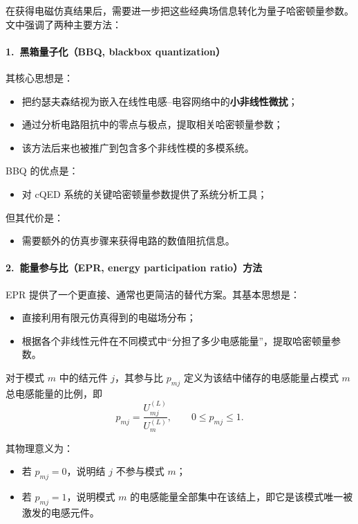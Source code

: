 \documentclass[12pt,a4paper,oneside]{ctexbook}
\begin{document}
在获得电磁仿真结果后，需要进一步把这些经典场信息转化为量子哈密顿量参数。文中强调了两种主要方法：

\paragraph{1.\ 黑箱量子化（BBQ, blackbox quantization）}
其核心思想是：
\begin{itemize}
    \item 把约瑟夫森结视为嵌入在线性电感--电容网络中的\textbf{小非线性微扰}；
    \item 通过分析电路阻抗中的零点与极点，提取相关哈密顿量参数；
    \item 该方法后来也被推广到包含多个非线性模的多模系统。
\end{itemize}

BBQ 的优点是：
\begin{itemize}
    \item 对 cQED 系统的关键哈密顿量参数提供了系统分析工具；
\end{itemize}

但其代价是：
\begin{itemize}
    \item 需要额外的仿真步骤来获得电路的数值阻抗信息。
\end{itemize}

\paragraph{2.\ 能量参与比（EPR, energy participation ratio）方法}
EPR 提供了一个更直接、通常也更简洁的替代方案。其基本思想是：
\begin{itemize}
    \item 直接利用有限元仿真得到的电磁场分布；
    \item 根据各个非线性元件在不同模式中“分担了多少电感能量”，提取哈密顿量参数。
\end{itemize}

对于模式 \(m\) 中的结元件 \(j\)，其参与比 \(p_{mj}\) 定义为该结中储存的电感能量占模式 \(m\) 总电感能量的比例，即
\[
p_{mj}=\frac{U^{(L)}_{mj}}{U^{(L)}_{m}},
\qquad 0\le p_{mj}\le 1.
\]

其物理意义为：
\begin{itemize}
    \item 若 \(p_{mj}=0\)，说明结 \(j\) 不参与模式 \(m\)；
    \item 若 \(p_{mj}=1\)，说明模式 \(m\) 的电感能量全部集中在该结上，即它是该模式唯一被激发的电感元件。
\end{itemize}
\end{document}
